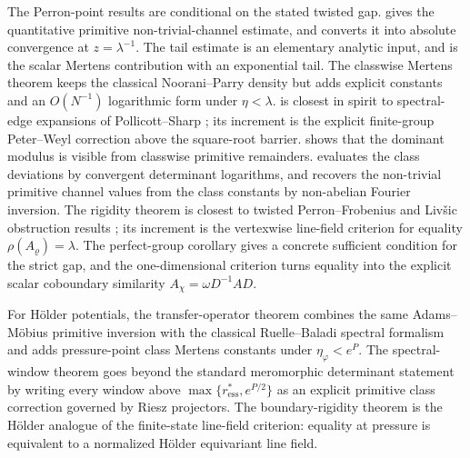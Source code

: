 The Perron-point results are conditional on the stated twisted gap.
 gives the quantitative
primitive non-trivial-channel estimate, and
 converts it into
absolute convergence at \(z=\lambda^{-1}\). The tail estimate
 is an elementary analytic input, and
 is the scalar Mertens
contribution with an exponential tail. The classwise Mertens theorem
 keeps the classical
Noorani--Parry density but adds explicit constants and an
\(O(N^{-1})\) logarithmic form under \(\eta<\lambda\).
 is closest in spirit to
spectral-edge expansions of Pollicott--Sharp
\cite{PollicottSharp1998Mertens}; its increment is the explicit
finite-group Peter--Weyl correction above the square-root barrier.
 shows that the
dominant modulus is visible from classwise primitive remainders.
 evaluates the class deviations by
convergent determinant logarithms, and
 recovers the non-trivial primitive
channel values from the class constants by non-abelian Fourier
inversion. The rigidity theorem  is closest
to twisted Perron--Frobenius and Liv\v{s}ic obstruction results
\cite{AdachiSunada1987TwistedPerronFrobenius,Parry1999LivsicNonAbelian};
its increment is the vertexwise line-field criterion for equality
\(\rho(A_\varrho)=\lambda\). The perfect-group corollary
 gives a concrete sufficient condition
for the strict gap, and the one-dimensional criterion
 turns equality into the
explicit scalar coboundary similarity \(A_\chi=\omega D^{-1}AD\).

For H\"older potentials, the transfer-operator theorem
 combines the same
Adams--M\"obius primitive inversion with the classical Ruelle--Baladi
spectral formalism
\cite{Ruelle1978Thermodynamic,Baladi2000PositiveTransfer,Baladi2018ZetaDeterminants}
and adds pressure-point class Mertens constants under
\(\eta_\varphi<e^P\). The spectral-window theorem
 goes beyond the standard
meromorphic determinant statement by writing every window above
\(\max\{r_{\mathrm{ess}}^\ast,e^{P/2}\}\) as an explicit primitive
class correction governed by Riesz projectors. The boundary-rigidity
theorem  is the H\"older
analogue of the finite-state line-field criterion: equality at pressure
is equivalent to a normalized H\"older equivariant line field.

